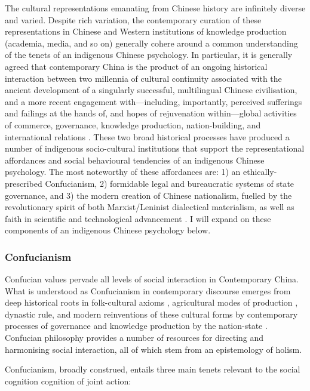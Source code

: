 \begin{CJK}{UTF8}{gbsn}
The cultural representations emanating from Chinese history are infinitely diverse and varied.  Despite rich variation, the contemporary curation of these representations in Chinese and Western institutions of knowledge production (academia, media, and so on) generally cohere around a common understanding of the tenets of an indigenous Chinese psychology. In particular, it is generally agreed that contemporary China is the product of an ongoing historical interaction between two millennia of cultural continuity associated with the ancient development of a singularly successful, multilingual Chinese civilisation, and a more recent engagement with---including, importantly, perceived sufferings and failings at the hands of, and hopes of rejuvenation within---global activities of commerce, governance, knowledge production, nation-building, and international relations \citep{Liu2009}.  These two broad historical processes have produced a number of indigenous socio-cultural institutions that support the representational affordances and social behavioural tendencies of an indigenous Chinese psychology.  The most noteworthy of these affordances are: 1) an ethically-prescribed Confucianism, 2) formidable legal and bureaucratic systems of state governance, and 3) the modern creation of Chinese nationalism, fuelled by the revolutionary spirit of both Marxist/Leninist dialectical materialism, as well as faith in scientific and technological advancement \citep{Barme2009}.  I will expand on these components of an indigenous Chinese psychology below.

\subsubsection{Confucianism}
Confucian values pervade all levels of social interaction in Contemporary China. What is understood as Confucianism in contemporary discourse emerges from deep historical roots in folk-cultural axioms \citep{Wang2009}, agricultural modes of production \citep{Talhelm2014,Fei1992}, dynastic rule, and modern reinventions of these cultural forms by contemporary processes of governance and knowledge production by the nation-state \citep{Hwang1999,Liu2014}.  Confucian philosophy provides a number of resources for directing and harmonising social interaction, all of which stem from an epistemology of holism.

Confucianism, broadly construed, entails three main tenets relevant to the social cognition cognition of joint action:


\end{CJK}
